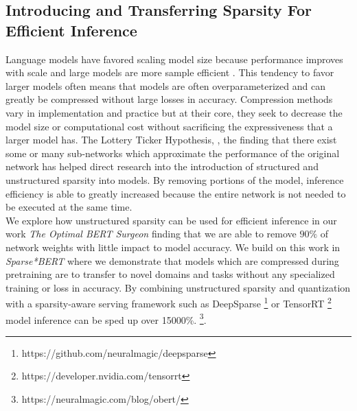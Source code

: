 \subsection{Introducing and Transferring Sparsity For Efficient Inference}
Language models have favored scaling model size because performance improves with scale \cite{Hestness2017DeepLS} \cite{Hernandez2021ScalingLF} and large models are more sample efficient \cite{Kaplan2020ScalingLF}. This tendency to favor larger models often means that models are often overparameterized and can greatly be compressed without large losses in accuracy. Compression methods vary in implementation and practice but at their core, they seek to decrease the model size or computational cost without sacrificing the expressiveness that a larger model has. The Lottery Ticker Hypothesis, \cite{Frankle2019TheLT}, \cite{Chen2020TheLT} the finding that there exist some or many sub-networks which approximate the performance of the original network has helped direct research into the introduction of structured and unstructured sparsity into models. By removing portions of the model, inference efficiency is able to greatly increased because the entire network is not needed to be executed at the same time. \\
We explore how unstructured sparsity can be used for efficient inference in our work 
 \textit{The Optimal BERT Surgeon} \cite{Kurtic2022TheOB} finding that we are able to remove $90\%$ of network weights with little impact to model accuracy. We build on this work in \textit{Sparse*BERT} \cite{Campos2022SparseBERTSM} where we demonstrate that models which are compressed during pretraining are to transfer to novel domains and tasks without any specialized training or loss in accuracy. By combining unstructured sparsity and quantization with a sparsity-aware serving framework such as DeepSparse \footnote{https://github.com/neuralmagic/deepsparse} or TensorRT \footnote{https://developer.nvidia.com/tensorrt} model inference can be sped up over 15000\%. \footnote{https://neuralmagic.com/blog/obert/}.
